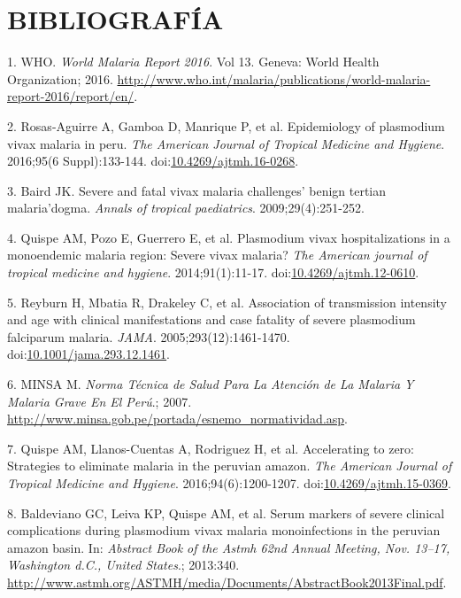 \documentclass[]{article}
\begin{document}
\section{BIBLIOGRAFÍA}\label{bibliografia}

\hypertarget{refs}{}
\hypertarget{ref-WHO2016world}{}
1. WHO. \emph{World Malaria Report 2016}. Vol 13. Geneva: World Health
Organization; 2016.
\url{http://www.who.int/malaria/publications/world-malaria-report-2016/report/en/}.

\hypertarget{ref-rosas2016peru}{}
2. Rosas-Aguirre A, Gamboa D, Manrique P, et al. Epidemiology of
plasmodium vivax malaria in peru. \emph{The American Journal of Tropical
Medicine and Hygiene}. 2016;95(6 Suppl):133-144.
doi:\href{https://doi.org/10.4269/ajtmh.16-0268}{10.4269/ajtmh.16-0268}.

\hypertarget{ref-baird2009}{}
3. Baird JK. Severe and fatal vivax malaria challenges' benign tertian
malaria'dogma. \emph{Annals of tropical paediatrics}.
2009;29(4):251-252.

\hypertarget{ref-quispe2014}{}
4. Quispe AM, Pozo E, Guerrero E, et al. Plasmodium vivax
hospitalizations in a monoendemic malaria region: Severe vivax malaria?
\emph{The American journal of tropical medicine and hygiene}.
2014;91(1):11-17.
doi:\href{https://doi.org/10.4269/ajtmh.12-0610}{10.4269/ajtmh.12-0610}.

\hypertarget{ref-reyburn2015}{}
5. Reyburn H, Mbatia R, Drakeley C, et al. Association of transmission
intensity and age with clinical manifestations and case fatality of
severe plasmodium falciparum malaria. \emph{JAMA}.
2005;293(12):1461-1470.
doi:\href{https://doi.org/10.1001/jama.293.12.1461}{10.1001/jama.293.12.1461}.

\hypertarget{ref-norma2001}{}
6. MINSA M. \emph{Norma Técnica de Salud Para La Atención de La Malaria
Y Malaria Grave En El Perú}.; 2007.
\url{http://www.minsa.gob.pe/portada/esnemo_normatividad.asp}.

\hypertarget{ref-accelerate2016}{}
7. Quispe AM, Llanos-Cuentas A, Rodriguez H, et al. Accelerating to
zero: Strategies to eliminate malaria in the peruvian amazon. \emph{The
American Journal of Tropical Medicine and Hygiene}.
2016;94(6):1200-1207.
doi:\href{https://doi.org/10.4269/ajtmh.15-0369}{10.4269/ajtmh.15-0369}.

\hypertarget{ref-baldevi2013}{}
8. Baldeviano GC, Leiva KP, Quispe AM, et al. Serum markers of severe
clinical complications during plasmodium vivax malaria monoinfections in
the peruvian amazon basin. In: \emph{Abstract Book of the Astmh 62nd
Annual Meeting, Nov. 13--17, Washington d.C., United States}.; 2013:340.
\url{http://www.astmh.org/ASTMH/media/Documents/AbstractBook2013Final.pdf}.
\end{document}
